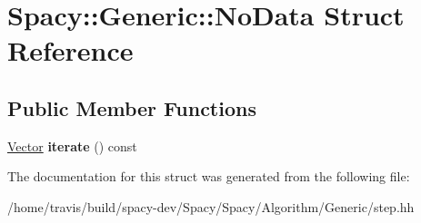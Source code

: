 \hypertarget{structSpacy_1_1Generic_1_1NoData}{\section{\-Spacy\-:\-:\-Generic\-:\-:\-No\-Data \-Struct \-Reference}
\label{structSpacy_1_1Generic_1_1NoData}
}
\subsection*{\-Public \-Member \-Functions}
\begin{DoxyCompactItemize}
\item 
\hypertarget{structSpacy_1_1Generic_1_1NoData_a2f6f7b1b8fba2eabe7dc36dca817b4a3}{\hyperlink{classSpacy_1_1Generic_1_1Vector}{\-Vector} {\bfseries iterate} () const }\label{structSpacy_1_1Generic_1_1NoData_a2f6f7b1b8fba2eabe7dc36dca817b4a3}

\end{DoxyCompactItemize}


\-The documentation for this struct was generated from the following file\-:\begin{DoxyCompactItemize}
\item 
/home/travis/build/spacy-\/dev/\-Spacy/\-Spacy/\-Algorithm/\-Generic/step.\-hh\end{DoxyCompactItemize}
